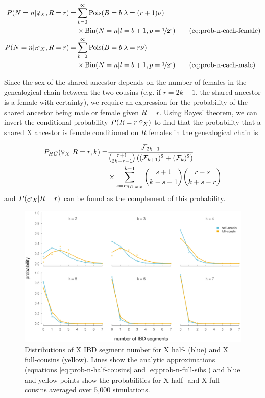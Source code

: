 \documentclass[9pt,twocolumn,twoside]{gsajnl}
\newcommand{\msxa}{\mars_X}
\newcommand{\fsxa}{\venus_X}
\begin{document}
\begin{align}
  P(N = n | \fsxa, R=r) =& \sum_{b=0}^\infty  \text{Pois}(B = b | \lambda = (r+1)\nu) \\ \nonumber 
  &\times \text{Bin}(N=n | l = b + 1, p=\nicefrac{1}{2^r}) \tag{eq:prob-n-each-female} \label{eq:prob-n-each-female} \\
  P(N = n | \msxa, R=r) =& \sum_{b=0}^\infty  \text{Pois}(B = b | \lambda = r\nu) \\ \nonumber 
  &\times \text{Bin}(N=n | l = b + 1, p=\nicefrac{1}{2^r}) \tag{eq:prob-n-each-male}  \label{eq:prob-n-each-male} 
\end{align}

Since the sex of the shared ancestor depends on the number of females in the
genealogical chain between the two cousins (e.g. if $r=2k-1$, the shared
ancestor is a female with certainty), we require an expression for the
probability of the shared ancestor being male or female given $R=r$. Using
Bayes' theorem, we can invert the conditional probability $P(R = r | \fsxa)$ to
find that the probability that a shared X ancestor is female conditioned on $R$
females in the genealogical chain is

\begin{align}
  \label{eq:prob-female-given-r}
  P_{HC}(\fsxa | R=r, k) =& \frac{\mathcal{F}_{2k-1} }{ { r+1 \choose 2k-r-1 }  \left( (\mathcal{F}_{k+1})^2 + (\mathcal{F}_k)^2 \right) } \\ \nonumber
  & \times \sum_{s=r_\text{HC min}}^{k-1}  {s + 1 \choose k - s + 1 } { r - s \choose k + s - r }
\end{align}
%
and $P(\msxa | R=r)$ can be found as the complement of this probability.

\begin{figure}[!ht]
  \centering

  \includegraphics[width=\textwidth]{images/x-full-half-blockcounts}

  \caption{Distributions of X IBD segment number for X half- (blue) and X
full-cousins (yellow). Lines show the analytic approximations (equations
\eqref{eq:prob-n-half-cousins} and \eqref{eq:prob-n-full-sibs}) and blue and
yellow points show the probabilities for X half- and X full-cousins averaged
over 5,000 simulations.}

  \label{fig:half-cousin-segment-number}
\end{figure}
\end{document}

